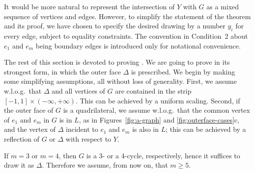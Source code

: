 It would be more natural to represent the intersection of $Y$ with $G$
as a mixed sequence of vertices and edges. However, to simplify the
statement of the theorem and its proof, we have chosen to specify the
desired drawing by a number $y_i$ for every edge, subject to equality
constraints. %
The convention in Condition~2 about $e_1$ and $e_m$ being boundary
edges is introduced only for
 notational convenience.


The rest of this section is devoted to proving . We
are going to prove  in its strongest form, in which the
outer face $\Delta$ is prescribed.  We begin by making some simplifying
assumptions, all without loss of generality.
%
%
%
First, we assume w.l.o.g.\ that $\Delta$ and all vertices of $G$ are
contained in the strip $[-1,1]\times(-\infty,+\infty)$.  This can be
achieved by a uniform scaling.  Second,
if the outer face of $G$ is
 a quadrilateral,
 we assume w.l.o.g.\
that the common vertex of $e_1$ and
$e_m$ in $G$ is in $L$, as in Figures~\ref{fig:a-graph} and
\ref{fig:outerface-cases}c,
and the
vertex of $\Delta$ incident to $e_1$ and $e_m$ is also in $L$;
this can be achieved by a
reflection of $G$ or $\Delta$ with respect to $Y$.



If $m=3$ or $m=4$, then $G$ is a 3- or a 4-cycle, respectively, hence it suffices to draw it as $\Delta$. Therefore we assume, from now on, that $m\ge 5$.  

